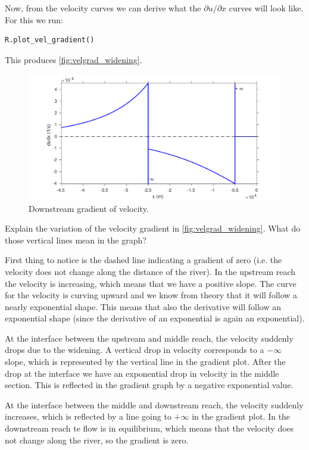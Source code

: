\documentclass[a4paper]{article}
\newcommand{\lpder}[2]{\partial#1/\partial#2}
\begin{document}
Now, from the velocity curves we can derive what the $\lpder{u}{x}$ curves will look like.
For this we run:
\begin{lstlisting}
R.plot_vel_gradient()
\end{lstlisting}
This produces \autoref{fig:velgrad_widening}.
\begin{figure}[ht]
  \centering
  \includegraphics[width=\linewidth]{matlab/velgrad_widening.pdf}
  \caption{Downstream gradient of velocity.}
  \label{fig:velgrad_widening}
\end{figure}
\begin{exercise}
  Explain the variation of the velocity gradient in \autoref{fig:velgrad_widening}. What do those vertical lines mean in the graph?
\end{exercise}

\begin{solution}
  First thing to notice is the dashed line indicating a gradient of zero (i.e. the velocity does not change along the distance of the river). In the upstream reach the velocity is increasing, which means that we have a positive slope. The curve for the velocity is curving upward and we know from theory that it will follow a nearly exponential shape. This means that also the derivative will follow an exponential shape (since the derivative of an exponential is again an exponential).
  
  At the interface between the upstream and middle reach, the velocity suddenly drops due to the widening. A vertical drop in velocity corresponds to a $-\infty$ slope, which is represented by the vertical line in the gradient plot. After the drop at the interface we have an exponential drop in velocity in the middle section. This is reflected in the gradient graph by a negative exponential value. 
  
  At the interface between the middle and downstream reach, the velocity suddenly increases, which is reflected by a line going to $+\infty$ in the gradient plot. In the downstream reach te flow is in equilibrium, which means that the velocity does not change along the river, so the gradient is zero.
\end{solution}
\end{document}
